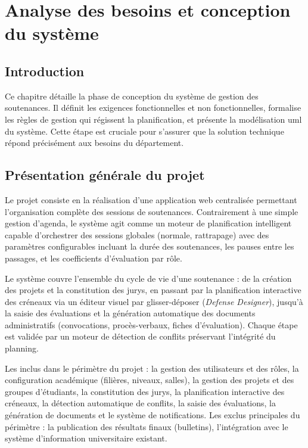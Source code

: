 \newpage
\section{Analyse des besoins et conception du système}
\label{ch3}

\subsection{Introduction}
\label{ch3:intro}

Ce chapitre détaille la phase de conception du système de gestion des soutenances. Il définit les exigences fonctionnelles et non fonctionnelles, formalise les règles de gestion qui régissent la planification, et présente la modélisation \acrshort{uml} du système. Cette étape est cruciale pour s'assurer que la solution technique répond précisément aux besoins du département.

\subsection{Présentation générale du projet}
\label{ch3:presentation_generale}

Le projet consiste en la réalisation d'une application web centralisée permettant l'organisation complète des sessions de soutenances. Contrairement à une simple gestion d'agenda, le système agit comme un moteur de planification intelligent capable d'orchestrer des sessions globales (normale, rattrapage) avec des paramètres configurables incluant la durée des soutenances, les pauses entre les passages, et les coefficients d'évaluation par rôle.

Le système couvre l'ensemble du cycle de vie d'une soutenance : de la création des projets et la constitution des jurys, en passant par la planification interactive des créneaux via un éditeur visuel par glisser-déposer (\textit{Defense Designer}), jusqu'à la saisie des évaluations et la génération automatique des documents administratifs (convocations, procès-verbaux, fiches d'évaluation). Chaque étape est validée par un moteur de détection de conflits préservant l'intégrité du planning.

Les inclus dans le périmètre du projet : la gestion des utilisateurs et des rôles, la configuration académique (filières, niveaux, salles), la gestion des projets et des groupes d'étudiants, la constitution des jurys, la planification interactive des créneaux, la détection automatique de conflits, la saisie des évaluations, la génération de documents et le système de notifications. Les exclus principales du périmètre : la publication des résultats finaux (bulletins), l'intégration avec le système d'information universitaire existant.

